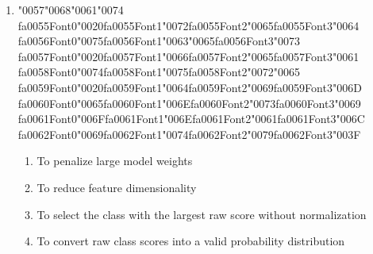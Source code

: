 \documentclass[12pt]{article}
\begin{document}
\begin{enumerate}[label=Q\arabic*.]
\item {\char"0057}{\char"0068}{\char"0061}{\char"0074} {\csname fa0055Font0\endcsname\char"0020}{\csname fa0055Font1\endcsname\char"0072}{\csname fa0055Font2\endcsname\char"0065}{\csname fa0055Font3\endcsname\char"0064} {\csname fa0056Font0\endcsname\char"0075}{\csname fa0056Font1\endcsname\char"0063}{\char"0065}{\csname fa0056Font3\endcsname\char"0073} {\csname fa0057Font0\endcsname\char"0020}{\csname fa0057Font1\endcsname\char"0066}{\csname fa0057Font2\endcsname\char"0065}{\csname fa0057Font3\endcsname\char"0061} {\csname fa0058Font0\endcsname\char"0074}{\csname fa0058Font1\endcsname\char"0075}{\csname fa0058Font2\endcsname\char"0072}{\char"0065} {\csname fa0059Font0\endcsname\char"0020}{\csname fa0059Font1\endcsname\char"0064}{\csname fa0059Font2\endcsname\char"0069}{\csname fa0059Font3\endcsname\char"006D} {\csname fa0060Font0\endcsname\char"0065}{\csname fa0060Font1\endcsname\char"006E}{\csname fa0060Font2\endcsname\char"0073}{\csname fa0060Font3\endcsname\char"0069} {\csname fa0061Font0\endcsname\char"006F}{\csname fa0061Font1\endcsname\char"006E}{\csname fa0061Font2\endcsname\char"0061}{\csname fa0061Font3\endcsname\char"006C} {\csname fa0062Font0\endcsname\char"0069}{\csname fa0062Font1\endcsname\char"0074}{\csname fa0062Font2\endcsname\char"0079}{\csname fa0062Font3\endcsname\char"003F}
\begin{enumerate}[label=(\Alph*)]
    \item To penalize large model weights
    \item To reduce feature dimensionality
    \item To select the class with the largest raw score without normalization
    \item To convert raw class scores into a valid probability distribution
\end{enumerate}

\end{enumerate}
\end{document}
